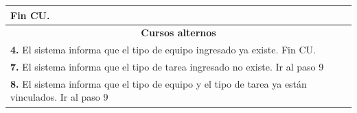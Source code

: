 \documentclass[12pt]{extarticle}
\begin{document}
\begin{spacing}{1.2}
\begin{longtable}{ |p{8cm}|p{8cm}| }


			\inc Fin CU. & \\
		\hline
		\multicolumn{2}{|c|}{\textbf{Cursos alternos}}\\
		\hline
		\multicolumn{2}{|p{16cm}|}{\textbf{4. }El sistema informa que el tipo de equipo ingresado ya existe. Fin CU.}\\
		\hline
		\multicolumn{2}{|p{16cm}|}{\textbf{7. }El sistema informa que el tipo de tarea ingresado no existe. Ir al paso 9}\\
		\hline	
		\multicolumn{2}{|p{16cm}|}{\textbf{8. }El sistema informa que el tipo de equipo y el tipo de tarea ya están vinculados. Ir al paso 9}\\
		\hline	
	\end{longtable}
    

\end{spacing}
\end{document}
